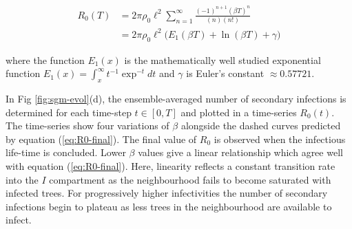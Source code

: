 \begin{equation} \label{eq:Appendix_final_expression}
\begin{split}
R_0(T) & = 2\pi\rho_0 \ell^2 \sum^{\infty}_{n=1} \frac{(-1)^{n+1} (\beta T)^n}{(n)(n!)}\\
& =  2\pi\rho_0 \ell^2 \big(E_1(\beta T) + \ln (\beta T) + \gamma\big)
\end{split}
\end{equation}

where the function $E_1(x)$ is the mathematically well studied exponential function $E_1(x)=\int^{\infty}_x t^{-1}\exp^{-t}dt$ and $\gamma$ is Euler's constant $\approx 0.57721$.


In Fig \ref{fig:sgm-evol}(d), the ensemble-averaged number of secondary infections is determined for each time-step $t\in [0, T]$ and plotted in a time-series $R_0(t)$. The time-series show four variations of $\beta$ alongside the dashed curves predicted by equation (\ref{eq:R0-final}). The final value of $R_0$ is observed when the infectious life-time is concluded. Lower $\beta$ values give a linear relationship which agree well with equation (\ref{eq:R0-final}). Here, linearity reflects a constant transition rate into the $I$ compartment as the neighbourhood fails to become saturated with infected trees. For progressively higher infectivities the number of secondary infections begin to plateau as less trees in the neighbourhood are available to infect.\\

